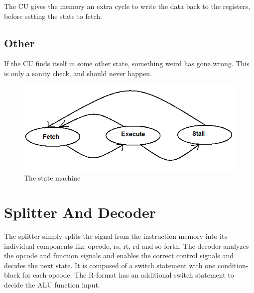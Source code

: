 The CU gives the memory an extra cycle to write the data back to the registers,
before setting the state to fetch.

\subsection{Other}

If the CU finds itself in some other state, something weird has gone wrong.
This is only a sanity check, and should never happen.

\begin{figure}[ht] \centering
\includegraphics[scale=0.5]{figures/controlunitstatemachine.png}
\caption{\label{fig:stateMachine}The state machine} \end{figure}

\section{Splitter And Decoder}

The splitter simply splits the signal from the instruction memory into its
individual components like opcode, rs, rt, rd and so forth.  The decoder
analyzes the opcode and function signals and enables the correct control signals
and decides the next state.  It is composed of a switch statement with one
condition-block for each opcode.  The R-format has an additional switch
statement to decide the ALU function input.

